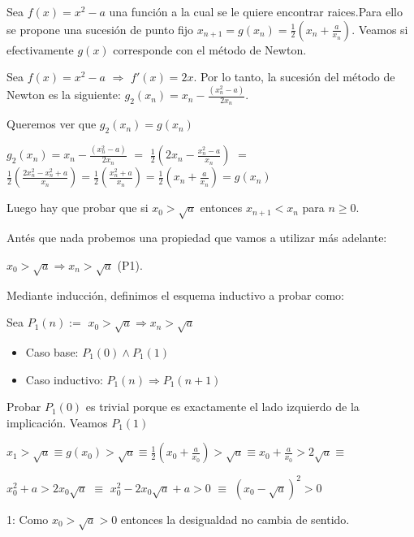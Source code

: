 Sea $f(x) = x^2 -a$ una funci\'on a la cual se le quiere encontrar raices.Para ello se propone una sucesi\'on de punto fijo $x_{n+1} = g(x_n) = \frac{1}{2}\left(x_n+ \frac{a}{x_n}\right)$. Veamos si efectivamente $g(x)$ corresponde con el m\'etodo de Newton.

Sea $f(x) = x^2 - a$ $\Rightarrow$ $f'(x) = 2x$. Por lo tanto, la sucesi\'on del m\'etodo de Newton es la siguiente: $g_{2}(x_n) = x_n - \frac{(x_{n}^2 -a)}{2x_n}$. 

Queremos ver que $g_2(x_n)=g(x_n)$ 

$\displaystyle g_{2}(x_n) = \displaystyle x_n - \frac{(x_{n}^2 -a)}{2x_n}$ $=$ $\displaystyle \frac{1}{2}\left(2x_n - \frac{x_{n}^2 - a}{x_n}\right)$ $=$ $\displaystyle \frac{1}{2}\left(\frac{2x_{n}^2 -x_{n}^2 + a}{x_n}\right) = \frac{1}{2}\left(\frac{x_{n}^2 + a}{x_n}\right) = \frac{1}{2}\left(x_{n} + \frac{a}{x_n}\right) = g(x_n)$

Luego hay que probar que si $x_0 > \sqrt{a}$ entonces $x_{n+1} < x_n$ para $n \geq 0$.

Ant\'es que nada probemos una propiedad que vamos a utilizar m\'as adelante:

\hspace{6.5cm}$x_0 > \sqrt{a} \Rightarrow x_n > \sqrt{a}$ (P1). 

Mediante inducci\'on, definimos el esquema inductivo a probar como:

Sea $P_1(n):=$ $x_0 > \sqrt{a} \Rightarrow x_n > \sqrt{a} $
\begin{itemize}
	\item Caso base: $P_1(0) \land P_1(1)$ 
	\item Caso inductivo: $P_1(n) \Rightarrow P_1(n+1)$
\end{itemize}

Probar $P_1(0)$ es trivial porque es exactamente el lado izquierdo de la implicaci\'on. Veamos $P_1(1)$

\hspace{4cm}$\displaystyle  x_1 > \sqrt{a} \equiv g(x_0) > \sqrt{a} \equiv \frac{1}{2}\left(x_0+ \frac{a}{x_0}\right) > \sqrt{a} \equiv x_0+ \frac{a}{x_0} > 2\sqrt{a}\equiv$


\hspace{4cm}$\displaystyle  x_{0}^2+ a > 2x_{0}\sqrt{a}$ \footnotemark[1] $\equiv$	$x_{0}^2 - 2x_{0}\sqrt{a} + a > 0$ $\equiv$ $\left(x_{0} - \sqrt{a}\right)^2 > 0$

1: Como $x_0 > \sqrt{a} > 0$ entonces la desigualdad no cambia de sentido.

